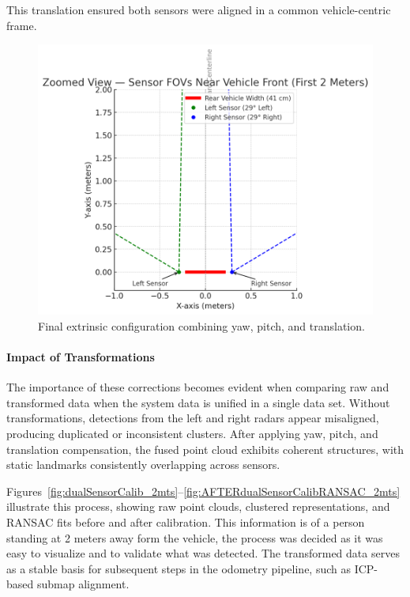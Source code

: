 This translation ensured both sensors were aligned in a common vehicle-centric frame.

\begin{figure}[!htbp]
    \centering
    \includegraphics[width=0.8\linewidth]{images/RotationSensor.png}
    \caption{Final extrinsic configuration combining yaw, pitch, and translation.}
    \label{fig:extrinsics}
\end{figure}

\vspace{2em}

\paragraph{Impact of Transformations}
The importance of these corrections becomes evident when comparing raw and transformed data when the system data is unified in a single data set. 
Without transformations, detections from the left and right radars appear misaligned, producing duplicated or inconsistent clusters. 
After applying yaw, pitch, and translation compensation, the fused point cloud exhibits coherent structures, with static landmarks consistently overlapping across sensors.

Figures~\ref{fig:dualSensorCalib_2mts}--\ref{fig:AFTERdualSensorCalibRANSAC_2mts} illustrate this process, showing raw point clouds, clustered representations, and RANSAC fits before and after calibration. 
This information is of a person standing at 2 meters away form the vehicle, the process was decided as it was easy to visualize and to validate what was detected.
The transformed data serves as a stable basis for subsequent steps in the odometry pipeline, such as ICP-based submap alignment.

